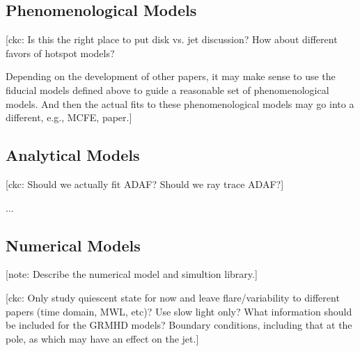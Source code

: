 \documentclass[twocolumn,tighten,dvipsnames]{aastex63}
\newcommand\<{{\langle}}
\renewcommand\>{{\rangle}} %
\newcommand\note[1]{{\color{OliveGreen}[note: #1]}}
\newcommand\ckc[1]{{\color{MidnightBlue}[ckc: #1]}}
\begin{document}
\subsection{Phenomenological Models}
\label{sec:phenomodels}

\ckc{Is this the right place to put disk vs. jet discussion?
  How about different favors of hotspot models?

  Depending on the development of other papers, it may make sense to
  use the fiducial models defined above to guide a reasonable set of
  phenomenological models.
  And then the actual fits to these phenomenological models may go
  into a different, e.g., MCFE, paper.}

\subsection{Analytical Models}
\label{sec:anamodels}

\ckc{Should we actually fit ADAF?
  Should we ray trace ADAF?}

...

\subsection{Numerical Models}
\label{sec:numodels}

\note{Describe the numerical model and simultion library.}

\ckc{Only study quiescent state for now and leave flare/variability to
  different papers (time domain, MWL, etc)?
  Use slow light only?
  What information should be included for the GRMHD models?
  Boundary conditions, including that at the pole, as which may have
  an effect on the jet.}

\end{document}
